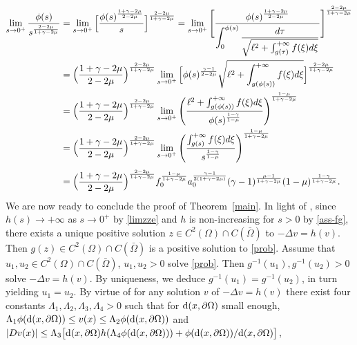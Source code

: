 \documentclass[10pt]{amsart}
\numberwithin{equation}{section}
\theoremstyle{definition}
\begin{document}
	\begin{align*}
	\lim_{s\to 0^+}\frac{\phi(s)}{s^{\frac{2-2\mu}{1+\gamma-2\mu}}} &=
	\lim_{s\to 0^+}\Big[\frac{\phi(s)^{\frac{1+\gamma-2\mu}{2-2\mu}}}{s}\Big]^{\frac{2-2\mu}{1+\gamma-2\mu}} 
	=\lim_{s\to 0^+}\Bigg[\frac{\phi(s)^{\frac{1+\gamma-2\mu}{2-2\mu}}}{
	\displaystyle\int_0^{\phi(s)}\frac{d\tau}{\sqrt{\ell^2+\int_{g(\tau)}^{+\infty}f(\xi)d\xi}}  }\Bigg]^{\frac{2-2\mu}{1+\gamma-2\mu}} \\
&=\Big(\frac{1+\gamma-2\mu}{2-2\mu}\Big)^{\frac{2-2\mu}{1+\gamma-2\mu}}
	\lim_{s\to 0^+}\Big[\phi(s)^{\frac{\gamma-1}{2-2\mu}}\sqrt{\ell^2+\int_{g(\phi(s))}^{+\infty}f(\xi)d\xi}\Big]^{\frac{2-2\mu}{1+\gamma-2\mu}}    \\
	&=\Big(\frac{1+\gamma-2\mu}{2-2\mu}\Big)^{\frac{2-2\mu}{1+\gamma-2\mu}}
		\lim_{s\to 0^+}\left(\frac{\ell^2+\int_{g(\phi(s))}^{+\infty}f(\xi)d\xi}{ \phi(s)^{\frac{1-\gamma}{1-\mu}} }\right)^{\frac{1-\mu}{1+\gamma-2\mu}}   \\
		&=\Big(\frac{1+\gamma-2\mu}{2-2\mu}\Big)^{\frac{2-2\mu}{1+\gamma-2\mu}}
			\lim_{s\to 0^+}\left(\frac{\int_{g(s)}^{+\infty}f(\xi)d\xi}{s^{\frac{1-\gamma}{1-\mu}} }\right)^{\frac{1-\mu}{1+\gamma-2\mu}}  \\
			\noalign{\vskip4pt}
		&=\Big(\frac{1+\gamma-2\mu}{2-2\mu}\Big)^{\frac{2-2\mu}{1+\gamma-2\mu}}		
		f_0^{\frac{1-\mu}{1+\gamma-2\mu}} a_0^{\frac{\gamma-1}{2(1+\gamma-2\mu)}}(\gamma-1)^{\frac{\mu-1}{1+\gamma-2\mu}} 
			(1-\mu)^{\frac{1-\gamma}{1+\gamma-2\mu}}.
	\end{align*}
We are now ready to conclude the proof 
of Theorem~\ref{main}. 
In light of \cite[Theorem 1.1]{craRabTar}, since $h(s)\to +\infty$ as $s\to 0^+$ by \eqref{limzze}
and $h$ is non-increasing for $s>0$ by \eqref{ass-fg}, there exists a unique positive solution $z\in C^2(\Omega)\cap C(\bar\Omega)$
to $-\Delta v=h(v)$. Then $g(z)\in C^2(\Omega)\cap C(\bar\Omega)$ is a positive solution to \eqref{prob}. Assume that
$u_1,u_2\in C^2(\Omega)\cap C(\bar\Omega)$, $u_1,u_2>0$ solve \eqref{prob}. Then $g^{-1}(u_1),g^{-1}(u_2)>0$ solve
$-\Delta v=h(v)$. By uniqueness, we deduce $g^{-1}(u_1)=g^{-1}(u_2)$, in turn yielding $u_1=u_2$. By virtue of 
\cite[Theorem 2.2 and Theorem 2.5]{craRabTar} for any solution $v$ of $-\Delta v=h(v)$
there exist four constants $\Lambda_1,\Lambda_2,\Lambda_3,\Lambda_4>0$ such that
for ${\rm d}(x,\partial\Omega)$ small enough, $\Lambda_1 \phi({\rm d}(x,\partial\Omega))\leq 
v(x)\leq \Lambda_2 \phi({\rm d}(x,\partial\Omega))$ and
$|Dv(x)|\leq \Lambda_3\big[{\rm d}(x,\partial\Omega)h(\Lambda_4\phi({\rm d}(x,\partial\Omega)))+\phi({\rm d}(x,\partial\Omega))/{\rm d}(x,\partial\Omega)\big]$, 
\end{document}
